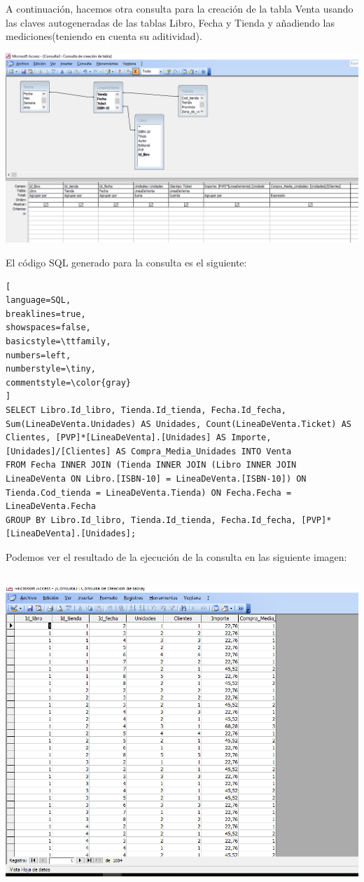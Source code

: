 \documentclass[paper=a4, fontsize=11pt, spanish]{scrartcl}
\numberwithin{equation}{section} %
\numberwithin{figure}{section} %
\numberwithin{table}{section} %
\begin{document}
A continuación, hacemos otra consulta para la creación de la tabla Venta usando las claves autogeneradas de las tablas Libro, Fecha y Tienda y añadiendo las mediciones(teniendo en cuenta su aditividad).
\begin{center}
	\includegraphics[scale=0.5]{img3.png}
\end{center}
El código SQL generado para la consulta es el siguiente:
\begin{lstlisting}[
language=SQL,
breaklines=true,
showspaces=false,
basicstyle=\ttfamily,
numbers=left,
numberstyle=\tiny,
commentstyle=\color{gray}
]
SELECT Libro.Id_libro, Tienda.Id_tienda, Fecha.Id_fecha, Sum(LineaDeVenta.Unidades) AS Unidades, Count(LineaDeVenta.Ticket) AS Clientes, [PVP]*[LineaDeVenta].[Unidades] AS Importe, [Unidades]/[Clientes] AS Compra_Media_Unidades INTO Venta
FROM Fecha INNER JOIN (Tienda INNER JOIN (Libro INNER JOIN LineaDeVenta ON Libro.[ISBN-10] = LineaDeVenta.[ISBN-10]) ON Tienda.Cod_tienda = LineaDeVenta.Tienda) ON Fecha.Fecha = LineaDeVenta.Fecha
GROUP BY Libro.Id_libro, Tienda.Id_tienda, Fecha.Id_fecha, [PVP]*[LineaDeVenta].[Unidades];
\end{lstlisting}
Podemos ver el resultado de la ejecución de la consulta en las siguiente imagen:\\
\\
\begin{center}
	\includegraphics[scale=0.5]{img4.png}
\end{center}
\bigskip 
\end{document}
